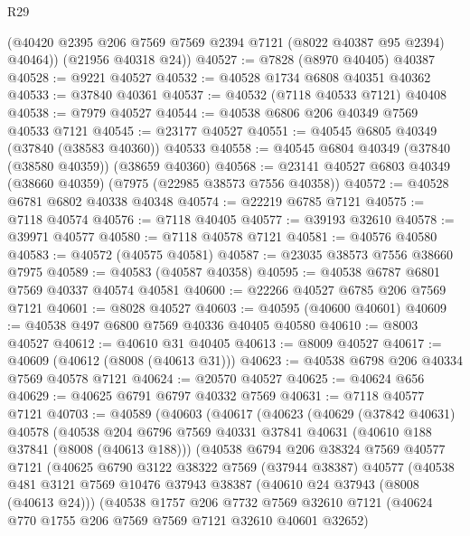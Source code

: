 \begin{lexlean}{R29}
\begin{coremodule}
        (@40420 @2395 @206 @7569 @7569 @2394 @7121 (@8022 @40387 @95 @2394) @40464))
      (@21956 @40318 @24))
@40527 := @7828 (@8970 @40405) @40387
@40528 := @9221 @40527
@40532 := @40528 @1734 @6808 @40351 @40362
@40533 := @37840 @40361
@40537 := @40532 (@7118 @40533 @7121) @40408
@40538 := @7979 @40527
@40544 := @40538 @6806 @206 @40349 @7569 @40533 @7121
@40545 := @23177 @40527
@40551 := @40545 @6805 @40349 (@37840 (@38583 @40360)) @40533
@40558 := @40545 @6804 @40349 (@37840 (@38580 @40359)) (@38659 @40360)
@40568 := @23141 @40527 @6803 @40349 (@38660 @40359) (@7975 (@22985 @38573 @7556 @40358))
@40572 := @40528 @6781 @6802 @40338 @40348
@40574 := @22219 @6785 @7121
@40575 := @7118 @40574
@40576 := @7118 @40405
@40577 := @39193 @32610
@40578 := @39971 @40577
@40580 := @7118 @40578 @7121
@40581 := @40576 @40580
@40583 := @40572 (@40575 @40581)
@40587 := @23035 @38573 @7556 @38660 @7975
@40589 := @40583 (@40587 @40358)
@40595 := @40538 @6787 @6801 @7569 @40337 @40574 @40581
@40600 := @22266 @40527 @6785 @206 @7569 @7121
@40601 := @8028 @40527
@40603 := @40595 (@40600 @40601)
@40609 := @40538 @497 @6800 @7569 @40336 @40405 @40580
@40610 := @8003 @40527
@40612 := @40610 @31 @40405
@40613 := @8009 @40527
@40617 := @40609 (@40612 (@8008 (@40613 @31)))
@40623 := @40538 @6798 @206 @40334 @7569 @40578 @7121
@40624 := @20570 @40527
@40625 := @40624 @656
@40629 := @40625 @6791 @6797 @40332 @7569
@40631 := @7118 @40577 @7121
@40703 := @40589
    (@40603
      (@40617
        (@40623
          (@40629
            (@37842 @40631)
            @40578
            (@40538
              @204
              @6796
              @7569
              @40331
              @37841
              @40631
              (@40610 @188 @37841 (@8008 (@40613 @188)))
              (@40538
                @6794
                @206
                @38324
                @7569
                @40577
                @7121
                (@40625
                  @6790
                  @3122
                  @38322
                  @7569
                  (@37944 @38387)
                  @40577
                  (@40538
                    @481
                    @3121
                    @7569
                    @10476
                    @37943
                    @38387
                    (@40610 @24 @37943 (@8008 (@40613 @24)))
                    (@40538
                      @1757
                      @206
                      @7732
                      @7569
                      @32610
                      @7121
                      (@40624 @770 @1755 @206 @7569 @7569 @7121 @32610 @40601 @32652)

\end{coremodule}
\end{lexlean}
